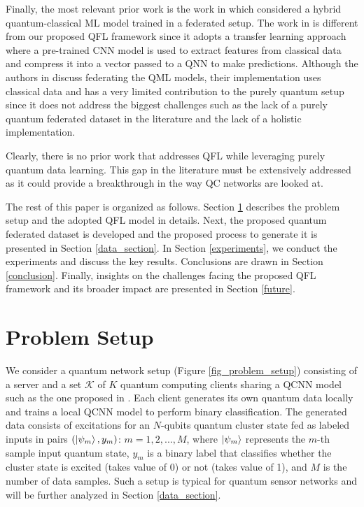 \documentclass{article}
\begin{document}
Finally, the most relevant prior work is the work in \cite{chen2021federated} which considered a hybrid quantum-classical ML model trained in a federated setup. The work in \cite{chen2021federated} is different from our proposed QFL framework since it adopts a transfer learning approach where a pre-trained CNN model is used to extract features from classical data and compress it into a vector passed to a QNN to make predictions. Although the authors in \cite{chen2021federated} discuss federating the QML models, their implementation uses classical data and has a very limited contribution to the purely quantum setup since it does not address the biggest challenges such as the lack of a purely quantum federated dataset in the literature and the lack of a holistic implementation.

Clearly, there is no prior work that addresses QFL while leveraging purely quantum data learning. This gap in the literature must be extensively addressed as it could provide a breakthrough in the way QC networks are looked at. 

The rest of this paper is organized as follows. Section \ref{Problem_setup} describes the problem setup and the adopted QFL model in details. Next, the proposed quantum federated dataset is developed and the proposed process to generate it is presented in Section \ref{data_section}. In Section \ref{experiments}, we conduct the experiments and discuss the key results. Conclusions are drawn in Section \ref{conclusion}. Finally, insights on the challenges facing the proposed QFL framework and its broader impact are presented in Section \ref{future}.
\section{Problem Setup}
\label{Problem_setup}
We consider a quantum network setup (Figure \ref{fig_problem_setup}) consisting of a server and a set $\mathcal{K}$ of $K$ quantum computing clients sharing a QCNN model such as the one proposed in \cite{Cong2019_QCNN}. Each client generates its own quantum data locally and trains a local QCNN model to perform binary classification. The generated data consists of excitations for an $N$-qubits quantum cluster state fed as labeled inputs in pairs $(\ket{\psi_m},y_m)$: $m = 1,2,...,M$, where $\ket{\psi_m}$ represents the $m$-th sample input quantum state, $y_m$ is a binary label that classifies whether the cluster state is excited (takes value of 0) or not (takes value of 1), and $M$ is the number of data samples. Such a setup is typical for quantum sensor networks and will be further analyzed in Section \ref{data_section}. 
\end{document}
